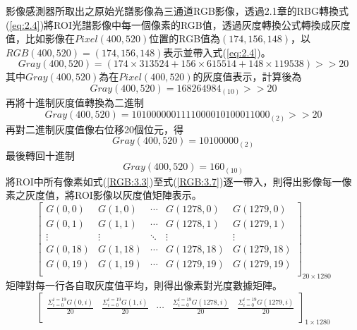 影像感測器所取出之原始光譜影像為三通道RGB影像，透過2.1章的RBG轉換式(\ref{eq:2.4})將ROI光譜影像中每一個像素的RGB值，透過灰度轉換公式轉換成灰度值，比如影像在$Pixel(400,520)$位置的RGB值為$(174,156,148)$，以$RGB(400,520)=(174,156,148)$表示並帶入式(\ref{eq:2.4})。
\begin{equation}
	Gray(400,520) = (174\times313524 + 156\times615514 + 148\times119538) >> 20
	\label{RGB:3.3}
\end{equation}
其中$Gray(400,520)$為在$Pixel(400,520)$的灰度值表示，計算後為
\begin{equation}
	Gray(400,520) = 168264984_{(10)} >> 20
	\label{RGB:3.4}
\end{equation}
再將十進制灰度值轉換為二進制
\begin{equation}
	Gray(400,520) = 1010000001111000010100011000_{(2)} >> 20
	\label{RGB:3.5}
\end{equation}
再對二進制灰度值像右位移20個位元，得
\begin{equation}
	Gray(400,520) = 10100000_{(2)}
	\label{RGB:3.6}
\end{equation}
最後轉回十進制
\begin{equation}
	Gray(400,520) = 160_{(10)}
	\label{RGB:3.7}
\end{equation}
將ROI中所有像素如式(\ref{RGB:3.3})至式(\ref{RGB:3.7})逐一帶入，則得出影像每一像素之灰度值，將ROI影像以灰度值矩陣表示。
\begin{equation}\label{RGB:3.8}
	\begin{bmatrix} 
		G(0,0)&G(1,0)&\cdots&G(1278,0)&G(1279,0)\\
		G(0,1)&G(1,1)&\cdots&G(1278,1)&G(1279,1)\\
		\vdots&\vdots&\ddots&\vdots&\vdots\\
		G(0,18)&G(1,18)&\cdots&G(1278,18)&G(1279,18)\\
		G(0,19)&G(1,19)&\cdots&G(1279,19)&G(1279,19)\\
	\end{bmatrix}_{20\times1280}
\end{equation}
矩陣對每一行各自取灰度值平均，則得出像素對光度數據矩陣。
\begin{equation}\label{RGB:3.9}
	\begin{bmatrix} 
		\frac{\Sigma_{i=0}^{i=19}G(0,i)}{20}&\frac{\Sigma_{i=0}^{i=19}G(1,i)}{20}&\cdots&\frac{\Sigma_{i=0}^{i=19}G(1278,i)}{20}&\frac{\Sigma_{i=0}^{i=19}G(1279,i)}{20}\\
	\end{bmatrix}_{1\times1280}
\end{equation}

